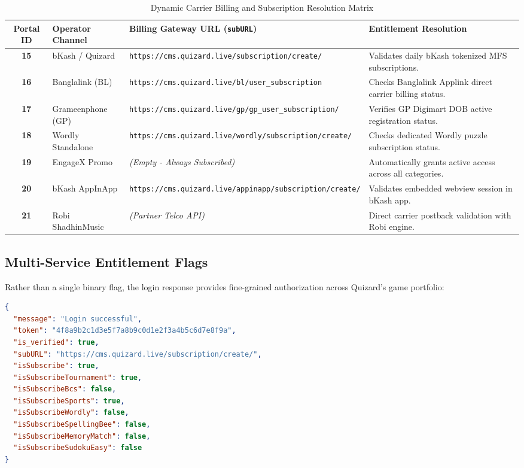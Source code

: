 \begin{table}[htbp]
\centering
\scriptsize
\begin{tabular}{|c|l|p{4.8cm}|p{6.0cm}|}
\hline
\rowcolor{primaryBlue!15}
\textbf{Portal ID} & \textbf{Operator Channel} & \textbf{Billing Gateway URL (\texttt{subURL})} & \textbf{Entitlement Resolution} \\ \hline
\textbf{15} & bKash / Quizard & \texttt{https://cms.quizard.live/}\newline\texttt{subscription/create/} & Validates daily bKash tokenized MFS subscriptions. \\ \hline
\textbf{16} & Banglalink (BL) & \texttt{https://cms.quizard.live/}\newline\texttt{bl/user\_subscription} & Checks Banglalink Applink direct carrier billing status. \\ \hline
\textbf{17} & Grameenphone (GP) & \texttt{https://cms.quizard.live/}\newline\texttt{gp/gp\_user\_subscription/} & Verifies GP Digimart DOB active registration status. \\ \hline
\textbf{18} & Wordly Standalone & \texttt{https://cms.quizard.live/}\newline\texttt{wordly/subscription/create/} & Checks dedicated Wordly puzzle subscription status. \\ \hline
\textbf{19} & EngageX Promo & \textit{(Empty - Always Subscribed)} & Automatically grants active access across all categories. \\ \hline
\textbf{20} & bKash AppInApp & \texttt{https://cms.quizard.live/}\newline\texttt{appinapp/subscription/create/} & Validates embedded webview session in bKash app. \\ \hline
\textbf{21} & Robi ShadhinMusic & \textit{(Partner Telco API)} & Direct carrier postback validation with Robi engine. \\ \hline
\end{tabular}
\caption{Dynamic Carrier Billing and Subscription Resolution Matrix}
\end{table}

\subsection{Multi-Service Entitlement Flags}
Rather than a single binary flag, the login response provides fine-grained authorization across Quizard's game portfolio:

\begin{lstlisting}[language=json, caption={Comprehensive Login Response Payload}]
{
  "message": "Login successful",
  "token": "4f8a9b2c1d3e5f7a8b9c0d1e2f3a4b5c6d7e8f9a",
  "is_verified": true,
  "subURL": "https://cms.quizard.live/subscription/create/",
  "isSubscribe": true,
  "isSubscribeTournament": true,
  "isSubscribeBcs": false,
  "isSubscribeSports": true,
  "isSubscribeWordly": false,
  "isSubscribeSpellingBee": false,
  "isSubscribeMemoryMatch": false,
  "isSubscribeSudokuEasy": false
}
\end{lstlisting}

